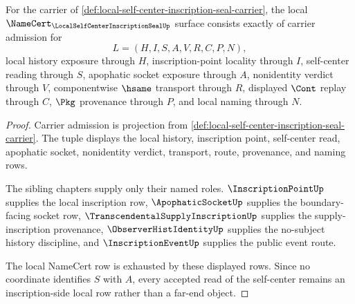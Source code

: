 \begin{theorem}
\label{thm:local-self-center-inscription-seal-namecert-obligations}
For the carrier of \autoref{def:local-self-center-inscription-seal-carrier}, the local $\NameCert_{\LocalSelfCenterInscriptionSealUp}$ surface consists exactly of carrier admission for
$$
L=(H,I,S,A,V,R,C,P,N),
$$
local history exposure through $H$, inscription-point locality through $I$, self-center reading through $S$, apophatic socket exposure through $A$, nonidentity verdict through $V$, componentwise $\hsame$ transport through $R$, displayed $\Cont$ replay through $C$, $\Pkg$ provenance through $P$, and local naming through $N$.
\end{theorem}
\begin{proof}
Carrier admission is projection from \autoref{def:local-self-center-inscription-seal-carrier}. The tuple displays the local history, inscription point, self-center read, apophatic socket, nonidentity verdict, transport, route, provenance, and naming rows.

The sibling chapters supply only their named roles. $\InscriptionPointUp$ supplies the local inscription row, $\ApophaticSocketUp$ supplies the boundary-facing socket row, $\TranscendentalSupplyInscriptionUp$ supplies the supply-inscription provenance, $\ObserverHistIdentityUp$ supplies the no-subject history discipline, and $\InscriptionEventUp$ supplies the public event route.

The local NameCert row is exhausted by these displayed rows. Since no coordinate identifies $S$ with $A$, every accepted read of the self-center remains an inscription-side local row rather than a far-end object.
\end{proof}

